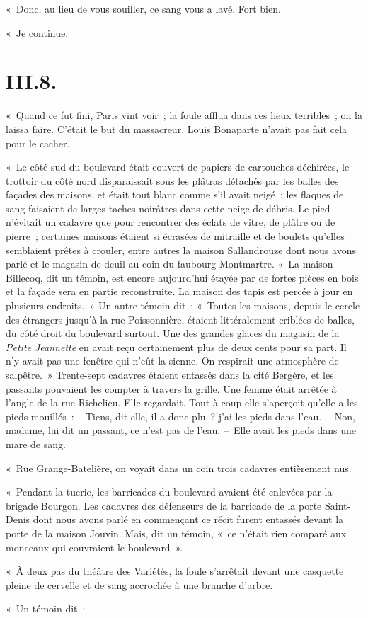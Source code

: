 \documentclass[french,twoside]{book} %
\begin{document}
« Donc, au lieu de vous souiller, ce sang vous a lavé. Fort bien.\par
« Je continue.

\section[{III.8.}]{III.8.}

\noindent « Quand ce fut fini, Paris vint voir ; la foule afflua dans ces lieux terribles ; on la laissa faire. C’était le but du massacreur. Louis Bonaparte n’avait pas fait cela pour le cacher.\par
« Le côté sud du boulevard était couvert de papiers de cartouches déchirées, le trottoir du côté nord disparaissait sous les plâtras détachés par les balles des façades des maisons, et était tout blanc comme s’il avait neigé ; les flaques de sang faisaient de larges taches noirâtres dans cette neige de débris. Le pied n’évitait un cadavre que pour rencontrer des éclats de vitre, de plâtre ou de pierre ; certaines maisons étaient si écrasées de mitraille et de boulets qu’elles semblaient prêtes à crouler, entre autres la maison Sallandrouze dont nous avons parlé et le magasin de deuil au coin du faubourg Montmartre. « La maison Billecoq, dit un témoin, est encore aujourd’hui étayée par de fortes pièces en bois et la façade sera en partie reconstruite. La maison des tapis est percée à jour en plusieurs endroits. » Un autre témoin dit : « Toutes les maisons, depuis le cercle des étrangers jusqu’à la rue Poissonnière, étaient littéralement criblées de balles, du côté droit du boulevard surtout. Une des grandes glaces du magasin de la \emph{Petite Jeannette} en avait reçu certainement plus de deux cents pour sa part. Il n’y avait pas une fenêtre qui n’eût la sienne. On respirait une atmosphère de salpêtre. » Trente-sept cadavres étaient entassés dans la cité Bergère, et les passants pouvaient les compter à travers la grille. Une femme était arrêtée à l’angle de la rue Richelieu. Elle regardait. Tout à coup elle s’aperçoit qu’elle a les pieds mouillés : – Tiens, dit-elle, il a donc plu ? j’ai les pieds dans l’eau. – Non, madame, lui dit un passant, ce n’est pas de l’eau. – Elle avait les pieds dans une mare de sang.\par
« Rue Grange-Batelière, on voyait dans un coin trois cadavres entièrement nus.\par
« Pendant la tuerie, les barricades du boulevard avaient été enlevées par la brigade Bourgon. Les cadavres des défenseurs de la barricade de la porte Saint-Denis dont nous avons parlé en commençant ce récit furent entassés devant la porte de la maison Jouvin. Mais, dit un témoin, « ce n’était rien comparé aux monceaux qui couvraient le boulevard ».\par
« À deux pas du théâtre des Variétés, la foule s’arrêtait devant une casquette pleine de cervelle et de sang accrochée à une branche d’arbre.\par
« Un témoin dit :\par
\end{document}
